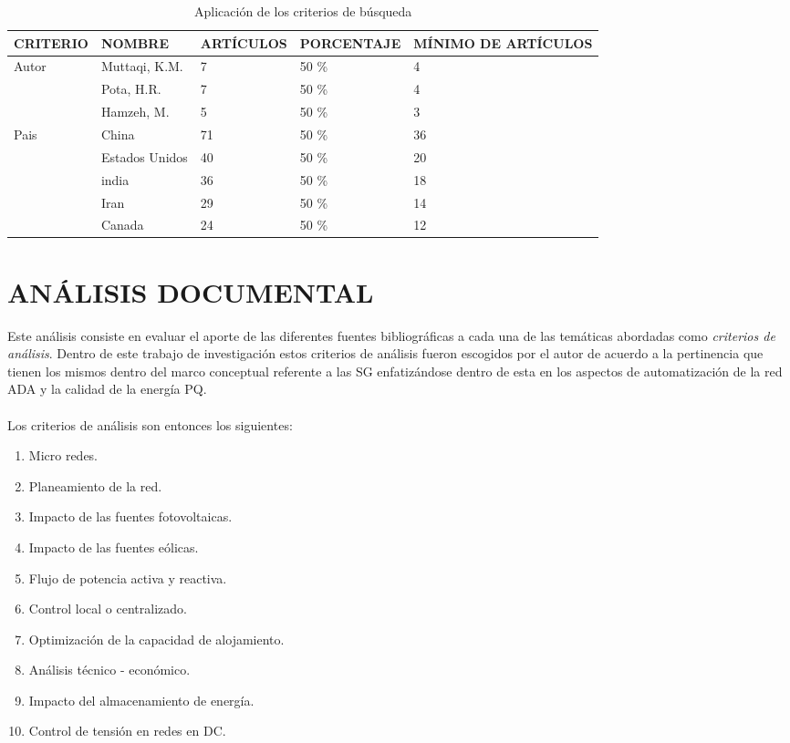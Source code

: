 \documentclass[12pt, letterpaper]{report}
\begin{document}
\begin{table}
    \caption{Aplicación de los criterios de búsqueda}
    \label{tab:criterios_busqueda }
\begin{tabular}{|l| m{3 cm}| m{3 cm}| m{3 cm} | m{2.8cm} |}
    \hline
    CRITERIO & NOMBRE &  ARTÍCULOS & PORCENTAJE & MÍNIMO DE ARTÍCULOS \\\hline
    \multirow{3}{4cm}{Autor} & Muttaqi, K.M. & 7 & 50 \% & 4\\\cline{2-5}
    & Pota, H.R.
     & 7 &50 \% & 4\\\cline{2-5}
    & Hamzeh, M.
      & 5 & 50 \% & 3\\\hline
    \multirow{5}{4 cm}{Pais} & China & 71 &50 \% & 36 \\\cline{2-5}
    & Estados Unidos & 40 &50 \% & 20 \\\cline{2-5}
    & india & 36 &50 \% & 18\\\cline{2-5}
    & Iran & 29 &50 \% & 14 \\\cline{2-5}
    & Canada & 24 &50 \% & 12\\\hline

   
\end{tabular} 
\end{table}



\chapter{ANÁLISIS DOCUMENTAL}
\label{cap:documental}

Este  análisis  consiste en evaluar el aporte de las diferentes fuentes bibliográficas a cada una de las temáticas abordadas  como \textit{criterios de análisis}. Dentro de este trabajo de investigación estos criterios de análisis fueron escogidos por el autor de acuerdo a la pertinencia que tienen los mismos dentro del marco conceptual referente a las \ac{SG} enfatizándose dentro de esta en los aspectos de  automatización de la red \ac{ADA} y la calidad de la energía \ac{PQ}.\\\\ 

Los criterios de análisis son entonces los siguientes:

\begin{enumerate}
    \item Micro redes.
    \item Planeamiento de la red.
    \item Impacto de las fuentes fotovoltaicas.
    \item Impacto de las fuentes eólicas.
    \item Flujo de potencia activa y reactiva.
    \item Control local  o centralizado.
    \item Optimización de la capacidad de alojamiento.
    \item Análisis técnico - económico.
    \item Impacto del almacenamiento de energía.
    \item Control de tensión en redes en DC.
\end{enumerate}
\end{document}
